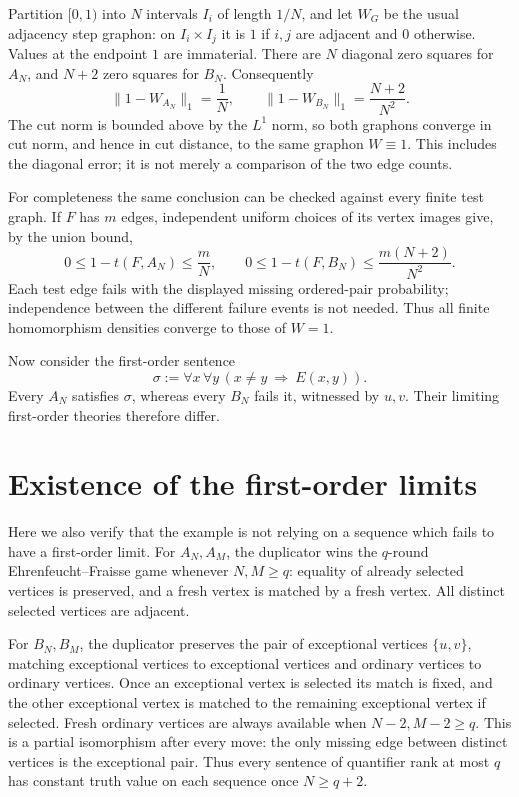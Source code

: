 \documentclass[11pt]{article}
\begin{document}
Partition $[0,1)$ into $N$ intervals $I_i$ of length $1/N$, and let
$W_G$ be the usual adjacency step graphon: on $I_i\times I_j$ it is
$1$ if $i,j$ are adjacent and $0$ otherwise. Values at the endpoint
$1$ are immaterial. There are $N$ diagonal zero squares for $A_N$,
and $N+2$ zero squares for $B_N$. Consequently
\[
 \|1-W_{A_N}\|_1=\frac1N,
 \qquad \|1-W_{B_N}\|_1=\frac{N+2}{N^2}.
\]
The cut norm is bounded above by the $L^1$ norm, so both graphons
converge in cut norm, and hence in cut distance, to the same graphon
$W\equiv1$. This includes the diagonal error; it is not merely a
comparison of the two edge counts.

For completeness the same conclusion can be checked against every finite
test graph. If $F$ has $m$ edges, independent uniform choices of its
vertex images give, by the union bound,
\[
 0\leq 1-t(F,A_N)\leq\frac mN,
 \qquad 0\leq1-t(F,B_N)\leq\frac{m(N+2)}{N^2}.
\]
Each test edge fails with the displayed missing ordered-pair probability;
independence between the different failure events is not needed.
Thus all finite homomorphism densities converge to those of $W=1$.

Now consider the first-order sentence
\[
 \sigma:=\forall x\,\forall y\,(x\ne y\ \Longrightarrow\ E(x,y)).
\]
Every $A_N$ satisfies $\sigma$, whereas every $B_N$ fails it, witnessed
by $u,v$. Their limiting first-order theories therefore differ.

\section*{Existence of the first-order limits}
Here we also verify that the example is not relying on a sequence which
fails to have a first-order limit. For $A_N,A_M$, the duplicator wins the
$q$-round Ehrenfeucht--Fraisse game whenever $N,M\geq q$: equality of
already selected vertices is preserved, and a fresh vertex is matched by
a fresh vertex. All distinct selected vertices are adjacent.

For $B_N,B_M$, the duplicator preserves the pair of exceptional vertices
$\{u,v\}$, matching exceptional vertices to exceptional vertices and
ordinary vertices to ordinary vertices. Once an exceptional vertex is
selected its match is fixed, and the other exceptional vertex is matched
to the remaining exceptional vertex if selected. Fresh ordinary vertices
are always available when $N-2,M-2\geq q$. This is a partial isomorphism
after every move: the only missing edge between distinct vertices is the
exceptional pair. Thus every sentence of quantifier rank at most $q$ has
constant truth value on each sequence once $N\geq q+2$.
\end{document}
